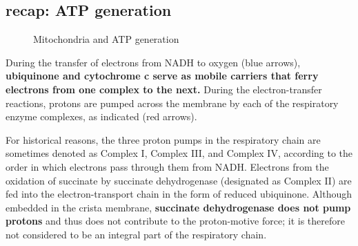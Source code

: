 \documentclass[../main.tex]{subfiles}
\begin{document}
\subsection{recap: ATP generation}
\begin{figure}[H]
	\centering
	\caption{Mitochondria and ATP generation}
\end{figure}
During the transfer of electrons from NADH to oxygen (blue arrows), \textbf{ubiquinone and cytochrome c serve as mobile carriers that ferry electrons from one complex to the next.} During the electron-transfer reactions, protons are pumped across the membrane by each of the respiratory enzyme complexes, as indicated (red arrows).

For historical reasons, the three proton pumps in the respiratory chain are sometimes denoted as Complex I, Complex III, and Complex IV, according to the order in which electrons pass through them from NADH. Electrons from the oxidation of succinate by succinate dehydrogenase (designated as Complex II) are fed into the electron-transport chain in the form of reduced ubiquinone. Although embedded in the crista membrane, \textbf{succinate dehydrogenase does not pump protons} and thus does not contribute to the proton-motive force; it is therefore not considered to be an integral part of the respiratory chain.
\end{document}
